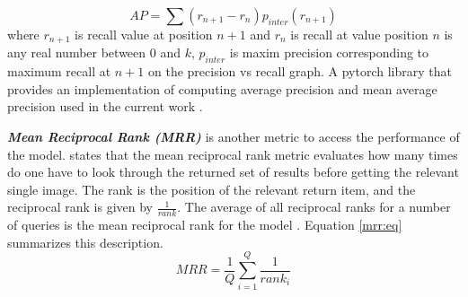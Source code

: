 \begin{equation}\label{ap:eq}
    AP = \sum(r_{n+1}-r_n)p_{inter}(r_{n+1})
\end{equation}
 where $r_{n+1}$ is recall value at position $n+1$ and $r_n$ is recall at value position $n$ is any real number between 0 and $k$, $p_{inter}$ is maxim precision corresponding to maximum recall at $n+1$ on the  precision vs recall graph. A pytorch library that provides an implementation of computing average precision and mean average precision used in the current work \cite{Collobert2016TorchnetAO}. \newline

\textbf{\textit{Mean Reciprocal Rank (MRR)}} is another metric to access the performance of the model. \citeauthor{liu2011learning} \citeyear{liu2011learning} \cite{liu2011learning} states that the mean reciprocal rank metric evaluates how many times do one have to look through the returned set of results before getting the relevant single image. The rank is the position of the relevant return item, and the reciprocal rank is given by $\frac{1}{rank}$. The average of all reciprocal ranks for a number of queries is the mean reciprocal rank for the model \cite{le2007direct}. Equation \ref{mrr:eq} summarizes this description.
\begin{equation}\label{mrr:eq}
    MRR = \frac{1}{Q}\sum_{i=1}^Q\frac{1}{rank_i}
\end{equation}{}

